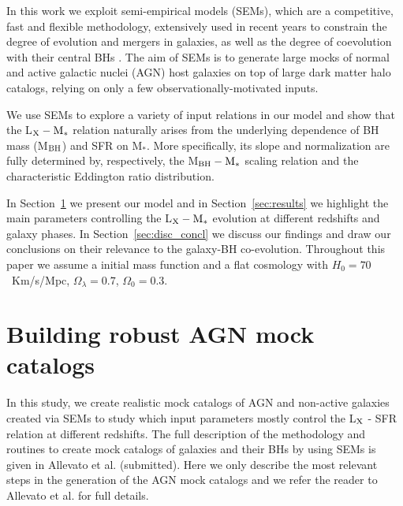 In this work we exploit semi-empirical models (SEMs), which are a competitive, fast and flexible methodology, extensively used in recent years to constrain the degree of evolution and mergers in galaxies, as well as the degree of coevolution with their central BHs \citep{2013ApJ...762...70C, 2019MNRAS.487..275G, 2019MNRAS.487.2005C, 2020arXiv201002957A}. The aim of SEMs is to generate large mocks of normal and 
active galactic nuclei (AGN) host galaxies
on top of large dark matter halo catalogs, relying on only a few observationally-motivated inputs. 

We use SEMs to explore a variety of input relations in our model and show that the L$_{\rm X}-{\rm M}_{*}$ relation naturally arises from the underlying dependence of BH mass (M$_{\rm BH}$) and SFR on M$_*$. More specifically, its slope and normalization are fully determined by, respectively, the M$_{\rm BH}-{\rm M}_*$ scaling relation and the characteristic Eddington ratio distribution. %

In Section~\ref{sec:model} we present our model and in Section~\ref{sec:results} we highlight the main parameters controlling the L$_{\rm X}-{\rm M}_*$ evolution at different redshifts and  galaxy phases.
In Section~\ref{sec:disc_concl} we discuss our findings and draw our conclusions on their relevance to the galaxy-BH co-evolution. Throughout this paper we assume a \citet{2003PASP..115..763C} initial mass function and a flat cosmology with $H_0=70$~Km/s/Mpc, $\Omega_\lambda=0.7$, $\Omega_0=0.3$.


\section{Building robust AGN mock catalogs}\label{sec:model}
In this study, we create realistic mock catalogs of AGN and non-active galaxies created via SEMs to study which input parameters mostly control the L$_{\rm X}$ - SFR relation at different redshifts. The full description of the methodology and routines to create mock catalogs of galaxies and their BHs by using SEMs is given in Allevato et al. (submitted). Here we only describe the most relevant steps in the generation of the AGN mock catalogs and we refer the reader to Allevato et al. for full details.

